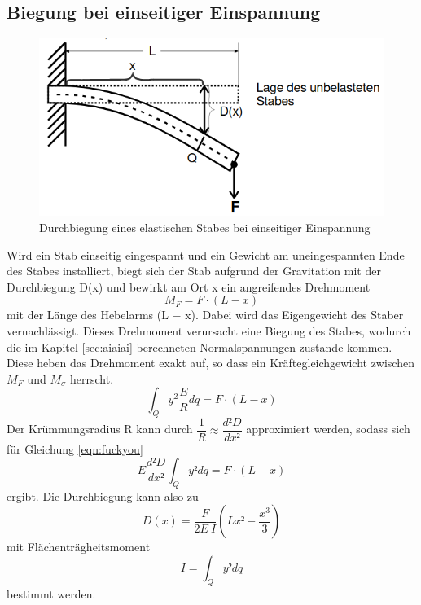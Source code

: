 \subsection{Biegung bei einseitiger Einspannung}
    \begin{figure}
        \centering
        \includegraphics[scale=0.5]{Lebertransuppe.png}
        \caption{Durchbiegung eines elastischen Stabes bei einseitiger Einspannung}
        \label{fig:lebertran}
    \end{figure}
    Wird ein Stab einseitig eingespannt und ein Gewicht am uneingespannten Ende des Stabes 
    installiert, biegt sich der Stab aufgrund der Gravitation mit der Durchbiegung D(x) 
    und bewirkt am Ort x ein angreifendes Drehmoment
    \begin{equation}
        M_F = F \cdot (L − x)
    \end{equation}
    mit der Länge des Hebelarms (L − x). Dabei wird das Eigengewicht des Staber vernachlässigt.
    Dieses Drehmoment verursacht eine Biegung des Stabes, wodurch die im Kapitel 
    \ref{sec:aiaiai} berechneten Normalspannungen zustande kommen. Diese heben das 
    Drehmoment exakt auf, so dass ein Kräftegleichgewicht zwischen $M_F$ und $M_{\sigma}$ herrscht.
    \begin{equation}
        \int_Q y^2 \dfrac{E}{R}dq  = F \cdot (L − x)
    \end{equation}
    Der Krümmungsradius R kann durch $\dfrac{1}{R} \approx 
    \dfrac{d²D}{dx²}$ approximiert werden, sodass sich für Gleichung \ref{eqn:fuckyou}
    \begin{equation}
        E \dfrac{d²D}{dx²} \int_Q y² dq=F\cdot(L-x)
    \end{equation}
    ergibt. Die Durchbiegung kann also zu
    \begin{equation}
        D(x)=\dfrac{F}{2 E \ I}(Lx²-\dfrac{x^3}{3})
        \label{eqn:hubert}
    \end{equation}
    mit Flächenträgheitsmoment
    \begin{equation}
        I = \int_Q y² dq
        \label{eqn:trage}
    \end{equation}
    bestimmt werden.

